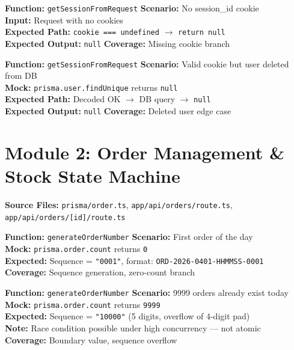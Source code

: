 \documentclass[12pt,a4paper]{report}
\newcommand{\pone}{\textbf{\color{p1red}P1}}
\newcommand{\ptwo}{\textbf{\color{p2orange}P2}}
\newcommand{\pthree}{\textbf{\color{p3blue}P3}}
\begin{document}
\begin{tcolorbox}[testbox,title={AUTH-015 \hfill \pone}]
\textbf{Function:} \texttt{getSessionFromRequest} \quad \textbf{Scenario:} No session\_id cookie \\
\textbf{Input:} Request with no cookies \\
\textbf{Expected Path:} \texttt{cookie === undefined} $\to$ \texttt{return null} \\
\textbf{Expected Output:} \texttt{null} \quad \textbf{Coverage:} Missing cookie branch
\end{tcolorbox}

\begin{tcolorbox}[testbox,title={AUTH-016 \hfill \ptwo}]
\textbf{Function:} \texttt{getSessionFromRequest} \quad \textbf{Scenario:} Valid cookie but user deleted from DB \\
\textbf{Mock:} \texttt{prisma.user.findUnique} returns \texttt{null} \\
\textbf{Expected Path:} Decoded OK $\to$ DB query $\to$ \texttt{null} \\
\textbf{Expected Output:} \texttt{null} \quad \textbf{Coverage:} Deleted user edge case
\end{tcolorbox}

\section{Module 2: Order Management \& Stock State Machine}

\textbf{Source Files:} \texttt{prisma/order.ts}, \texttt{app/api/orders/route.ts}, \texttt{app/api/orders/[id]/route.ts}

\begin{tcolorbox}[testbox,title={ORD-001 \hfill \ptwo}]
\textbf{Function:} \texttt{generateOrderNumber} \quad \textbf{Scenario:} First order of the day \\
\textbf{Mock:} \texttt{prisma.order.count} returns \texttt{0} \\
\textbf{Expected:} Sequence = \texttt{"0001"}, format: \texttt{ORD-2026-0401-HHMMSS-0001} \\
\textbf{Coverage:} Sequence generation, zero-count branch
\end{tcolorbox}

\begin{tcolorbox}[testbox,title={ORD-002 \hfill \pthree\ --- Boundary}]
\textbf{Function:} \texttt{generateOrderNumber} \quad \textbf{Scenario:} 9999 orders already exist today \\
\textbf{Mock:} \texttt{prisma.order.count} returns \texttt{9999} \\
\textbf{Expected:} Sequence = \texttt{"10000"} (5 digits, overflow of 4-digit pad) \\
\textbf{Note:} Race condition possible under high concurrency --- not atomic \\
\textbf{Coverage:} Boundary value, sequence overflow
\end{tcolorbox}
\end{document}

